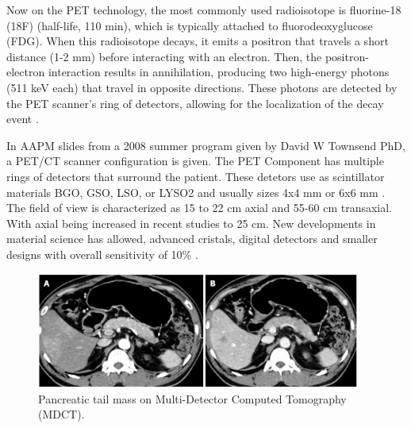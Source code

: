 \begin{multicols}{2}
Now on the PET technology, the most commonly used radioisotope is fluorine-18 (18F) (half-life, 110 min), which is typically attached to fluorodeoxyglucose (FDG). When this radioisotope decays, it emits a positron that travels a short distance (1-2 mm) before interacting with an electron. Then, the positron-electron interaction results in annihilation, producing two high-energy photons (511 keV each) that travel in opposite directions. These photons are detected by the PET scanner's ring of detectors, allowing for the localization of the decay event \cite{Vaquero2015}. 


In AAPM slides from a 2008 summer program given by David W Townsend PhD, a PET/CT scanner configuration is given. The PET Component has multiple rings of detectors that surround the patient. These detetors use as scintillator materials BGO, GSO, LSO, or LYSO2 and usually sizes 4x4 mm or 6x6 mm \cite{Townsend2008}.  
The field of view is characterized as 15 to 22 cm axial and 55-60 cm transaxial. With axial being increased in recent studies to 25 cm.
New developments in material science has allowed, advanced cristals, digital detectors and smaller designs with overall  sensitivity of 10\% \cite{Jones2017}.

\end{multicols}

\begin{figure}[H]
	\centering
	\includegraphics[width=0.95\textwidth]{assets/WJG-20-7864-g003.jpg}
	\caption{Pancreatic tail mass on Multi-Detector Computed Tomography (MDCT).\cite{Lee2014}}
	\label{fig:pancreatic_mass}
\end{figure}
 

